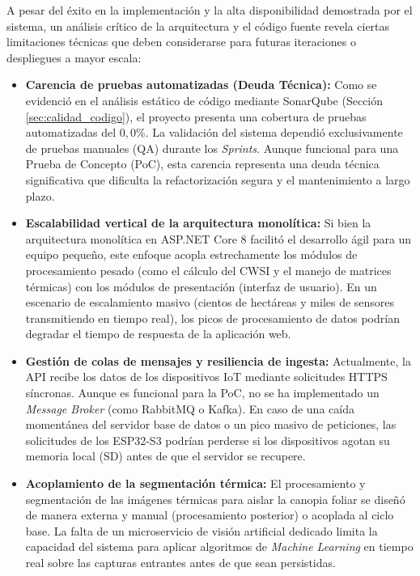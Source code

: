 A pesar del éxito en la implementación y la alta disponibilidad demostrada por el sistema, un análisis crítico de la arquitectura y el código fuente revela ciertas limitaciones técnicas que deben considerarse para futuras iteraciones o despliegues a mayor escala:

\begin{itemize}
    \item \textbf{Carencia de pruebas automatizadas (Deuda Técnica):} Como se evidenció en el análisis estático de código mediante SonarQube (Sección \ref{sec:calidad_codigo}), el proyecto presenta una cobertura de pruebas automatizadas del $0,0\%$. La validación del sistema dependió exclusivamente de pruebas manuales (QA) durante los \textit{Sprints}. Aunque funcional para una Prueba de Concepto (PoC), esta carencia representa una deuda técnica significativa que dificulta la refactorización segura y el mantenimiento a largo plazo.
    
    \item \textbf{Escalabilidad vertical de la arquitectura monolítica:} Si bien la arquitectura monolítica en ASP.NET Core 8 facilitó el desarrollo ágil para un equipo pequeño, este enfoque acopla estrechamente los módulos de procesamiento pesado (como el cálculo del CWSI y el manejo de matrices térmicas) con los módulos de presentación (interfaz de usuario). En un escenario de escalamiento masivo (cientos de hectáreas y miles de sensores transmitiendo en tiempo real), los picos de procesamiento de datos podrían degradar el tiempo de respuesta de la aplicación web.
    
    \item \textbf{Gestión de colas de mensajes y resiliencia de ingesta:} Actualmente, la API recibe los datos de los dispositivos IoT mediante solicitudes HTTPS síncronas. Aunque es funcional para la PoC, no se ha implementado un \textit{Message Broker} (como RabbitMQ o Kafka). En caso de una caída momentánea del servidor base de datos o un pico masivo de peticiones, las solicitudes de los ESP32-S3 podrían perderse si los dispositivos agotan su memoria local (SD) antes de que el servidor se recupere.
    
    \item \textbf{Acoplamiento de la segmentación térmica:} El procesamiento y segmentación de las imágenes térmicas para aislar la canopia foliar se diseñó de manera externa  y manual (procesamiento posterior) o acoplada al ciclo base. La falta de un microservicio de visión artificial dedicado limita la capacidad del sistema para aplicar algoritmos de \textit{Machine Learning} en tiempo real sobre las capturas entrantes antes de que sean persistidas.
\end{itemize}

